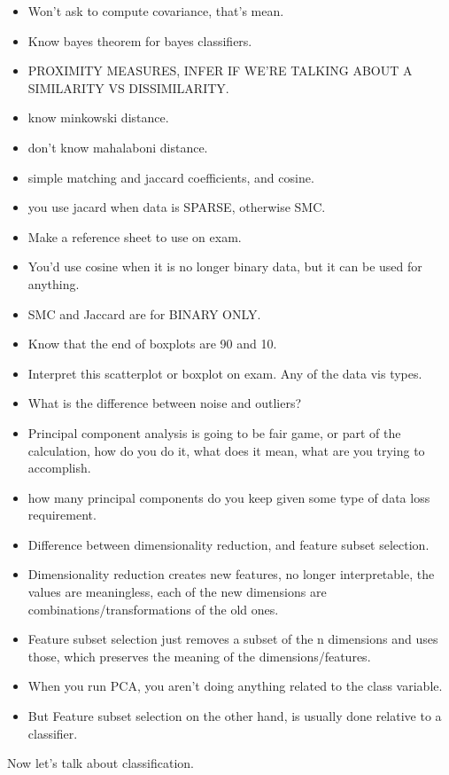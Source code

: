\documentclass{amsbook}
\theoremstyle{plain}
\numberwithin{section}{chapter}
\numberwithin{equation}{chapter}
\theoremstyle{definition}
\theoremstyle{remark}
\begin{document}
\begin{itemize}
\item Won't ask to compute covariance, that's mean. 
\item Know bayes theorem for bayes classifiers. 
\item PROXIMITY MEASURES, INFER IF WE'RE TALKING ABOUT A SIMILARITY VS DISSIMILARITY. 
\item know minkowski distance. 
\item don't know mahalaboni distance. 
\item simple matching and jaccard coefficients, and cosine. 
\item you use jacard when data is SPARSE, otherwise SMC. 
\item Make a reference sheet to use on exam. 
\item You'd use cosine when it is no longer binary data, but it can be used for anything. 
\item SMC and Jaccard are for BINARY ONLY. 
\item Know that the end of boxplots are 90 and 10. 
\item Interpret this scatterplot or boxplot on exam. Any of the data vis types. 
\item What is the difference between noise and outliers?
\item Principal component analysis is going to be fair game, or part of the calculation, how do you do it, what does it mean, what are you trying to accomplish. 
\item how many principal components do you keep given some type of data loss requirement. 
\item Difference between dimensionality reduction, and feature subset selection. 
\item Dimensionality reduction creates new features, no longer interpretable, the values are meaningless, each of the new dimensions are combinations/transformations of the old ones. 
\item Feature subset selection just removes a subset of the n dimensions and uses those, which preserves the meaning of the dimensions/features. 
\item When you run PCA, you aren't doing anything related to the class variable.
\item But Feature subset selection on the other hand, is usually done relative to a classifier. 
\end{itemize}


Now let's talk about classification. 
\end{document}
